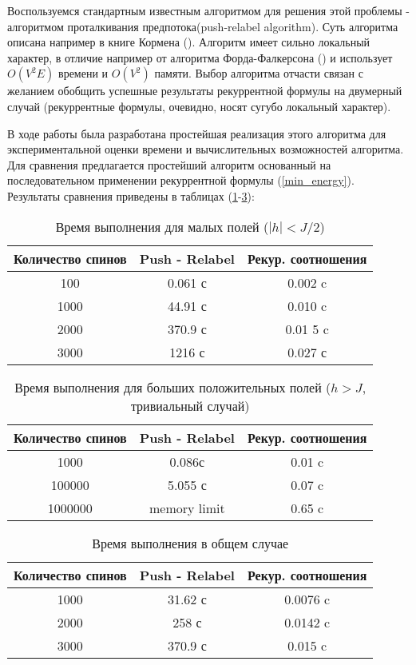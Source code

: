 Воспользуемся стандартным известным алгоритмом для решения этой проблемы - алгоритмом проталкивания предпотока(push-relabel algorithm). Суть алгоритма описана например в книге Кормена (\cite{cormen2009introduction}). Алгоритм имеет сильно локальный характер, в отличие например от алгоритма Форда-Фалкерсона (\cite{ford1956maximal}) и использует $O(V^2 E)$ времени и $O(V^2)$ памяти. Выбор алгоритма отчасти связан с желанием обобщить успешные результаты рекуррентной формулы на двумерный случай (рекуррентные формулы, очевидно, носят сугубо локальный характер).

В ходе работы была разработана простейшая реализация этого алгоритма для экспериментальной оценки времени и вычислительных возможностей алгоритма. Для сравнения предлагается простейший алгоритм основанный на последовательном применении рекуррентной формулы (\ref{min_energy}). Результаты сравнения приведены в таблицах (\ref{table1}-\ref{table3}):

\begin{table}[h!]
\centering
\begin{tabular}{ |c|c|c| } 
	\hline
	Количество спинов & Push - Relabel & Рекур. соотношения \\
	\hline
	100 & 0.061 с & 0.002 c\\
	\hline
	1000 & 44.91 с & 0.010 c \\
	\hline
	2000 & 370.9 с & 0.01	5 c \\
	\hline
	3000 & 1216 с & 0.027 с \\
	\hline
\end{tabular}
	\caption{Время выполнения для малых полей ($|h|<J/2$)}
	\label{table1}
\end{table}
\begin{table}[h!]
	\centering
	\begin{tabular}{ |c|c|c| } 
		\hline
		Количество спинов & Push - Relabel & Рекур. соотношения \\
		\hline
		1000 & 0.086с & 0.01 c\\
		\hline
		100000 & 5.055 с & 0.07 c \\
		\hline
		1000000 & memory limit & 0.65 c \\
		\hline
	\end{tabular}
	\caption{Время выполнения для больших положительных полей ($h>J$,  тривиальный случай)}
	\label{table2}
\end{table}

\begin{table}[h!]
	\centering
	\begin{tabular}{ |c|c|c| } 
		\hline
		Количество спинов & Push - Relabel & Рекур. соотношения \\
		\hline
		1000 & 31.62 с & 0.0076 c\\
		\hline
		2000 & 258 с & 0.0142 c \\
		\hline
		3000 & 370.9 с & 0.015 c \\
		\hline
	\end{tabular}
	\caption{Время выполнения в общем случае}
	\label{table3}
\end{table}


	